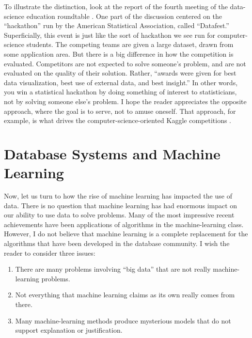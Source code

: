 \documentclass[11pt]{article}
\begin{document}
To illustrate the distinction, look at the report of the fourth meeting of the data-science education roundtable \cite{datafest}.  One part of the discussion centered on the ``hackathon'' run by the American Statistical Association, called ``Datafest.''  Superficially, this event is just like the sort of hackathon we see run for computer-science students.  The competing teams are given a large dataset, drawn from some application area.  But there is a big difference in how the competition is evaluated.  Competitors are not expected to solve someone's problem, and are not evaluated on the quality of their solution.  Rather, ``awards were given for best data visualization, best use of external data, and best insight.''  In other words, you win a statistical hackathon by doing something of interest to statisticians, not by solving someone else's problem.  I hope the reader appreciates the opposite approach, where the goal is to serve, not to amuse oneself.  That approach, for example, is what drives the computer-science-oriented Kaggle competitions \cite{kaggle}.

\section{Database Systems and Machine Learning}

Now, let us turn to how the rise of machine learning has impacted the use of data.  There is no question that machine learning has had enormous impact on our ability to use data to solve problems.  Many of the most impressive recent achievements have been applications of algorithms in the machine-learning class.  However, I do not believe that machine learning is a complete replacement for the algorithms that have been developed in the database community.  I wish the reader to consider three issues:

\begin{enumerate}

\item
There are many problems involving ``big data'' that are not really machine-learning problems.

\item
Not everything that machine learning claims as its own really comes from there.

\item
Many machine-learning methods produce mysterious models that do not support explanation or justification.

\end{enumerate}
\end{document}
